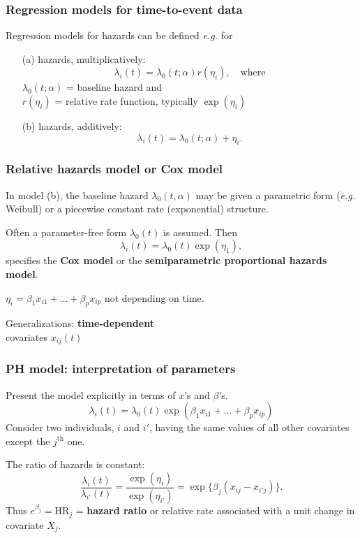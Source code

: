 \documentclass[handout,12pt,dvipsnames,t]{beamer}
\begin{document}
\begin{frame}[fragile]
\frametitle{Regression models for time-to-event data}


Regression models for hazards can be defined \textit{e.g.} for 
\begin{itemize}
\item[(a)] hazards, multiplicatively: $$ 
\lambda_i(t) = \lambda_0(t; \alpha) r(\eta_i), \quad\text{where}$$
$\lambda_0(t; \alpha)$ = baseline hazard and \\
$r(\eta_i)$ = relative rate function, typically $\exp(\eta_i)$
\medskip
\pause
\item[(b)] hazards, additively: 
$$ \lambda_i(t) = \lambda_0(t; \alpha) + \eta_i. $$
\end{itemize}
\end{frame}


\begin{frame}[fragile]
\frametitle{Relative hazards model or Cox model}

In model (b), the baseline hazard $\lambda_0(t,\alpha)$ may be given a parametric form (\textit{e.g.} Weibull) or
a piecewise constant rate (exponential) structure.

\bigskip
Often a parameter-free form $\lambda_0(t)$ is assumed. Then
\[
  \lambda_i(t) = \lambda_0(t) \exp(\eta_1),
\]
specifies the \textbf{Cox model} or the \textbf{semiparametric proportional hazards model}.

\bigskip
$\eta_i = \beta_1 x_{i1} + \dots + \beta_p x_{ip}$ not depending on time.  

\bigskip
Generalizations: \textbf{time-dependent} \\ covariates $x_{ij}(t)$



\end{frame}


\begin{frame}[fragile]
\frametitle{PH model: interpretation of parameters}

Present the model explicitly in terms of $x$'s and $\beta$'s.
\[
\lambda_i(t) = \lambda_0(t)  \exp({\beta_1 x_{i1} + \dots +
\beta_p x_{ip}})
\]
Consider two individuals, $i$ and $i'$, having the same values of all
other covariates except the $j^{\text{th}}$ one.

\bigskip
The ratio of hazards is constant:
$$  \frac{\lambda_i(t)}{\lambda_{i'}(t)} = \frac{\exp( \eta_{i}) }{\exp(\eta_{i'})}
= \exp \{ \beta_j(x_{ij}-x_{i'j}) \} . $$
Thus $e^{\beta_j} = \text{HR}_j$ = \textbf{hazard ratio} or relative rate
 associated with
 a unit change in covariate $X_j$.

\end{frame}
\end{document}
